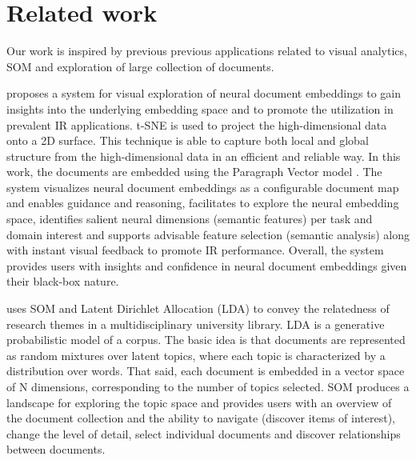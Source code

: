 \documentclass[a4paper]{article}
\begin{document}


\section*{Related work}
Our work is inspired by previous previous applications related to visual analytics, SOM and exploration of large collection of documents.

\citet{ji2019} proposes a system for visual exploration of neural document embeddings to gain insights into the underlying embedding space and to promote the utilization in prevalent IR applications. t-SNE \citep{vandermaaten2008} is used to project the high-dimensional data onto a 2D surface. This technique is able to capture both local and global structure from the high-dimensional data in an efficient and reliable way. In this work, the documents are embedded using the Paragraph Vector model \citep{le2014}. The system visualizes neural document embeddings as a configurable document map and enables guidance and reasoning, facilitates to explore the neural embedding space, identifies salient neural dimensions (semantic features) per task and domain interest and supports advisable feature selection (semantic analysis) along with instant visual feedback to promote IR performance. Overall, the system provides users with insights and confidence in neural document embeddings given their black-box nature.

\citet{lafia2019} uses SOM and Latent Dirichlet Allocation (LDA) \citep{blei2003} to convey the relatedness of research themes in a multidisciplinary university library. LDA is a generative probabilistic model of a corpus. The basic idea is that documents are represented as random mixtures over latent topics, where each topic is characterized by a distribution over words. That said, each document is embedded in a vector space of N dimensions, corresponding to the number of topics selected. SOM produces a landscape for exploring the topic space and provides users with an overview of the document collection and the ability to navigate (discover items of interest), change the level of detail, select individual documents and discover relationships between documents.
\end{document}
